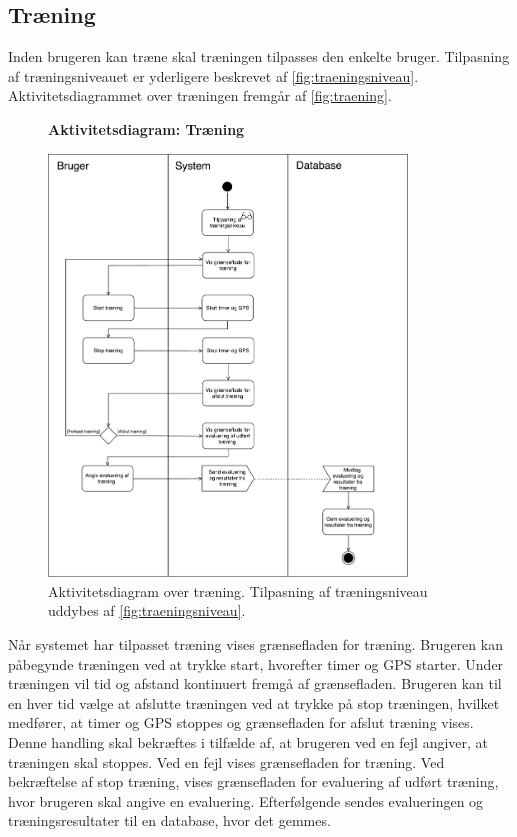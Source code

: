 \subsection*{Træning} \label{sec:traening}
Inden brugeren kan træne skal træningen tilpasses den enkelte bruger. Tilpasning af træningsniveauet er  yderligere beskrevet af \autoref{fig:traeningsniveau}.
Aktivitetsdiagrammet over træningen fremgår af \autoref{fig:traening}. 

\begin{figure} [H]
\centering
\textbf{Aktivitetsdiagram: Træning}\par\medskip
\includegraphics[width=0.85\textwidth]{figures/aktivitetsdiagram/Traening}
\caption{Aktivitetsdiagram over træning. Tilpasning af træningsniveau uddybes af \autoref{fig:traeningsniveau}.}
\label{fig:traening}
\end{figure}

\noindent
Når systemet har tilpasset træning vises grænsefladen for træning. Brugeren kan påbegynde træningen ved at trykke start, hvorefter timer og GPS starter. Under træningen vil tid og afstand kontinuert fremgå af grænsefladen. Brugeren kan til en hver tid vælge at afslutte træningen ved at trykke på stop træningen, hvilket medfører, at timer og GPS stoppes og grænsefladen for afslut træning vises. Denne handling skal bekræftes i tilfælde af, at brugeren ved en fejl angiver, at træningen skal stoppes. Ved en fejl vises grænsefladen for træning. Ved bekræftelse af stop træning, vises grænsefladen for evaluering af udført træning, hvor brugeren skal angive en evaluering. Efterfølgende sendes evalueringen og træningsresultater til en database, hvor det gemmes.


